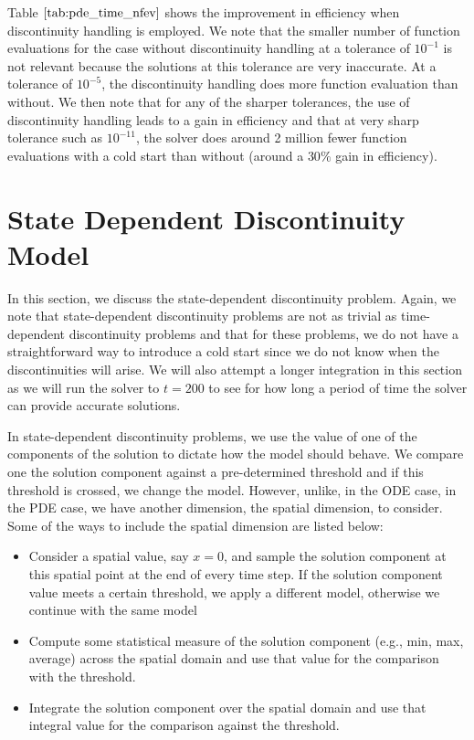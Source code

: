 Table $\ref{tab:pde_time_nfev}$ shows the improvement in efficiency when discontinuity handling is employed. We note that the smaller number of function evaluations for the case without discontinuity handling at a tolerance of $10^{-1}$ is not relevant because the solutions at this tolerance are very inaccurate. At a tolerance of $10^{-5}$, the discontinuity handling does more function evaluation than without. We then note that for any of the sharper tolerances, the use of discontinuity handling leads to a gain in efficiency and that at very sharp tolerance such as $10^{-11}$, the solver does around 2 million fewer function evaluations with a cold start than without (around a $30\%$ gain in efficiency). 

\section{State Dependent Discontinuity Model}
\label{subsection:pde_state_intro}
In this section, we discuss the state-dependent discontinuity problem. Again, we note that state-dependent discontinuity problems are not as trivial as time-dependent discontinuity problems and that for these problems, we do not have a straightforward way to introduce a cold start since we do not know when the discontinuities will arise. We will also attempt a longer integration in this section as we will run the solver to $t=200$ to see for how long a period of time the solver can provide accurate solutions.

In state-dependent discontinuity problems, we use the value of one of the components of the solution to dictate how the model should behave. We compare one the solution component against a pre-determined threshold and if this threshold is crossed, we change the model. However, unlike, in the ODE case, in the PDE case, we have another dimension, the spatial dimension, to consider. Some of the ways to include the spatial dimension are listed below:
\begin{itemize}
\item Consider a spatial value, say $x=0$, and sample the solution component at this spatial point at the end of every time step. If the solution component value meets a certain threshold, we apply a different model, otherwise we continue with the same model

\item Compute some statistical measure of the solution component (e.g., min, max, average) across the spatial domain and use that value for the comparison with the threshold.

\item Integrate the solution component over the spatial domain and use that integral value for the comparison against the threshold.
\end{itemize}

